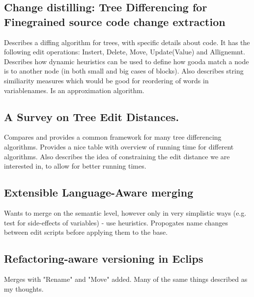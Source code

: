 \documentclass[12pt]{article}
\begin{document}
\subsection{Change distilling: Tree Differencing for Finegrained source code change extraction}
Describes a diffing algorithm for trees, with specific details about code. It has the following edit operations: Instert, Delete, Move, Update(Value) and Allignemnt. Describes how dynamic heuristics can be used to define how gooda match a node is to another node (in both small and big cases of blocks). Also describes string similiarity measures which would be good for reordering of words in variablenames. Is an approximation algorithm.

\subsection{A Survey on Tree Edit Distances.}
Compares and provides a common framework for many tree differencing algorithms. Provides a nice table with overview of running time for different algorithms. Also describes the idea of constraining the edit distance we are interested in, to allow for better running times.

\subsection{Extensible Language-Aware merging}
Wants to merge on the semantic level, however only in very simplistic ways (e.g. test for side-effects of variables) - use heuristics. Propogates name changes between edit scripts before applying them to the base.

\subsection{Refactoring-aware versioning in Eclips}
Merges with "Rename" and "Move" added. Many of the same things described as my thoughts.



\end{document}
